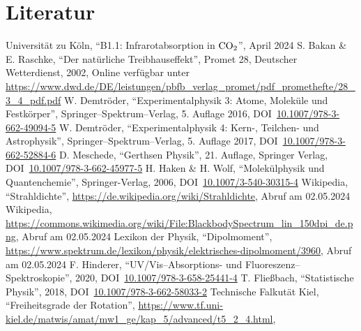\documentclass[12pt,a4paper]{scrartcl}
\numberwithin{equation}{section} %
\begin{document}
	\clearpage
	\hypertarget{literatur}{%
		\section{Literatur}\label{literatur}}
	\renewcommand{\section}[2]{} %
	\begin{thebibliography}{9}
		Universität zu Köln, ``B1.1: Infrarotabsorption in $\ce{CO_2}$'', April 2024
		S. Bakan \& E. Raschke, ``Der natürliche Treibhauseffekt'', Promet 28,
		Deutscher Wetterdienst, 2002, Online verfügbar unter
		\url{https://www.dwd.de/DE/leistungen/pbfb_verlag_promet/pdf_promethefte/28_3_4_pdf.pdf}
		W. Demtröder, ``Experimentalphysik 3: Atome, Moleküle und Festkörper'',
		Springer--Spektrum--Verlag, 5. Auflage 2016,
		DOI~\href{https://doi.org/10.1007/978-3-662-49094-5}{10.1007/978-3-662-49094-5}
		W. Demtröder, ``Experimentalphysik 4: Kern-, Teilchen- und Astrophysik'',
		Springer--Spektrum--Verlag, 5. Auflage 2017, DOI~\href{https://doi.org/10.1007/978-3-662-52884-6}{10.1007/978-3-662-52884-6}
		D. Meschede, ``Gerthsen Physik'', 21. Auflage, Springer Verlag,
		DOI~\href{https://doi.org/10.1007/978-3-662-45977-5}{10.1007/978-3-662-45977-5}
		H. Haken \& H. Wolf, ``Molekülphysik und Quantenchemie'', Springer-Verlag, 2006,
		DOI~\href{https://doi.org/10.1007/3-540-30315-4}{10.1007/3-540-30315-4}
		Wikipedia, ``Strahldichte'',
		\url{https://de.wikipedia.org/wiki/Strahldichte}, Abruf am 02.05.2024
		Wikipedia, \url{https://commons.wikimedia.org/wiki/File:BlackbodySpectrum_lin_150dpi_de.png},
		Abruf am 02.05.2024
		Lexikon der Physik, ``Dipolmoment'',
		\url{https://www.spektrum.de/lexikon/physik/elektrisches-dipolmoment/3960},
		Abruf am 02.05.2024
		F. Hinderer, ``UV/Vis--Absorptions- und Fluoreszenz--Spektroskopie'',
		2020,
		DOI~\href{https://doi.org/10.1007/978-3-658-25441-4}{10.1007/978-3-658-25441-4}
		T. Fließbach, ``Statistische Physik'', 2018,
		DOI~\href{https://doi.org/10.1007/978-3-662-58033-2}{10.1007/978-3-662-58033-2}
		Technische Falkutät Kiel, ``Freiheitsgrade der Rotation'',
		\url{https://www.tf.uni-kiel.de/matwis/amat/mw1_ge/kap_5/advanced/t5_2_4.html},

\end{thebibliography}
\end{document}
